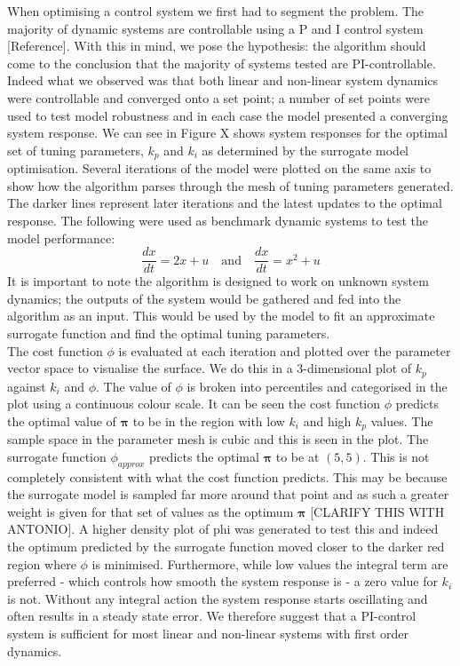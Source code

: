 \documentclass[conference]{IEEEtran}
\theoremstyle{definition}
\begin{document}
When optimising a control system we first had to segment the problem. The majority of dynamic systems are controllable using a P and I control system [Reference]. With this in mind, we pose the hypothesis: the algorithm should come to the conclusion that the majority of systems tested are PI-controllable. Indeed what we observed was that both linear and non-linear system dynamics were controllable and converged onto a set point; a number of set points were used to test model robustness and in each case the model presented a converging system response. We can see in Figure X shows system responses for the optimal set of tuning parameters, $k_p$ and $k_i$  as determined by the surrogate model optimisation. Several iterations of the model were plotted on the same axis to show how the algorithm parses through the mesh of tuning parameters generated. The darker lines represent later iterations and the latest updates to the optimal response. The following were used as benchmark dynamic systems to test the model performance:
\begin{equation}
\frac{dx}{dt} = 2x +u \quad \textrm{and} \quad \frac{dx}{dt} = x^2 + u
\end{equation}
It is important to note the algorithm is designed to work on unknown system dynamics; the outputs of the system would be gathered and fed into the algorithm as an input. This would be used by the model to fit an approximate surrogate function and find the optimal tuning parameters.\\
The cost function $\phi$ is evaluated at each iteration and plotted over the parameter vector space to visualise the surface. We do this in a 3-dimensional plot of $k_p$ against $k_i$ and $\phi$. The value of $\phi$ is broken into percentiles and categorised in the plot using a continuous colour scale. It can be seen the cost function $\phi$ predicts the optimal value of $\boldsymbol \pi$ to be in the region with low $k_i$ and high $k_p$ values. The sample space in the parameter mesh is cubic and this is seen in the plot. The surrogate function $\phi_{approx}$ predicts the optimal $\boldsymbol \pi$ to be at $(5,5)$. This is not completely consistent with what the cost function predicts. This may be because the surrogate model is sampled far more around that point and as such a greater weight is given for that set of values as the optimum $\boldsymbol \pi$ [CLARIFY THIS WITH ANTONIO]. A higher density plot of phi was generated to test this and indeed the optimum predicted by the surrogate function moved closer to the darker red region where $\phi$ is minimised. 
Furthermore, while low values the integral term are preferred - which controls how smooth the system response is - a zero value for $k_i$ is not. Without any integral action the system response starts oscillating and often results in a steady state error. We therefore suggest that a PI-control system is sufficient for most linear and non-linear systems with first order dynamics. 
\end{document}
